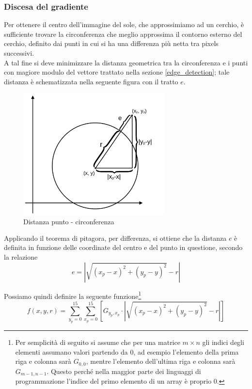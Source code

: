 \documentclass[12pt]{article}
\begin{document}
        
        \subsubsection{Discesa del gradiente}
        Per ottenere il centro dell'immagine del sole, che approssimiamo ad un cerchio, è sufficiente trovare la circonferenza che meglio approssima il contorno esterno del cerchio, definito dai punti in cui si ha una differenza più netta tra pixels successivi. \\
        A tal fine si deve minimizzare la distanza geometrica tra la circonferenza e i punti con magiore modulo del vettore trattato nella sezione \ref{edge_detection}; tale distanza è schematizzata nella seguente figura con il tratto $ e $.

        \begin{figure}[h]
        \centering
            \includegraphics[width=220pt]{Draws/Discesa_del_gradiente_cerchio-punto.png}
            \caption{Distanza punto - circonferenza}
        \end{figure}
        
        \noindent
        Applicando il teorema di pitagora, per differenza, si ottiene che la distanza $ e $ è definita in funzione delle coordinate del centro e del punto in questione, secondo la relazione
        \begin{equation}
             e = \left| \sqrt{(x_p-x)^2 + (y_p-y)^2} -r \right|
        \end{equation}
        
        \noindent
        Possiamo quindi definire la seguente funzione\footnote{Per semplicità di seguito si assume che per una matrice $m \times n$ gli indici degli elementi assumano valori partendo da 0, ad esempio l'elemento della prima riga e colonna sarà $G_{0,0}$, mentre l'elemento dell'ultima riga e colonna sarà $G_{m-1, n-1}$. Questo perché nella maggior parte dei linguaggi di programmazione l'indice del primo elemento di un array è proprio 0.}
        \begin{equation}
            f(x, y, r) = \sum_{y_p = 0}^{15} \sum_{x_p = 0}^{15} \left[ G_{y_p, x_p} \cdot \left| \sqrt{(x_p-x)^2 + (y_p-y)^2} -r \right| \right] 
        \end{equation}
        
\end{document}
